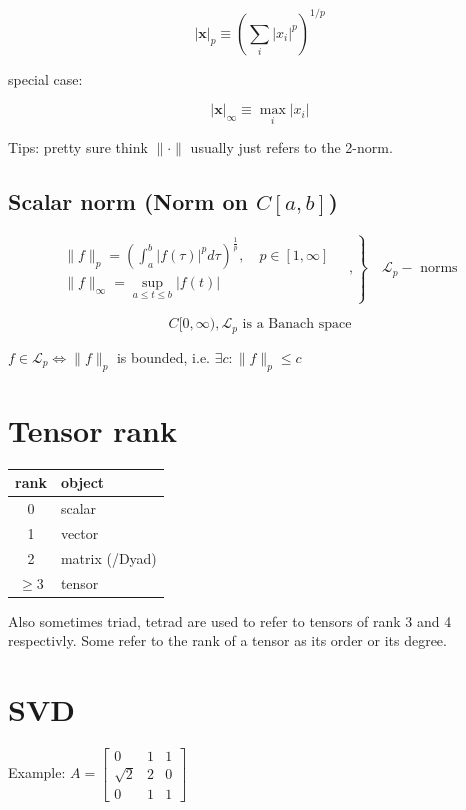 \documentclass[a4paper]{article}
\begin{document}
$$|\mathbf{x}|_{p} \equiv\left(\sum_{i}\left|x_{i}\right|^{p}\right)^{1 / p}$$

special case:

$$|\mathbf{x}|_{\infty} \equiv \max _{i}\left|x_{i}\right|$$



Tips: pretty sure think $\|\cdot\|$ usually just refers to the 2-norm.


\subsection*{Scalar norm (Norm on $C[a, b]$)}
\label{sec-1-4}

\begin{equation}
\left.\begin{array}{l}
{\|f\|_{p}=\left(\int_{a}^{b}|f(\tau)|^{p} d \tau\right)^{\frac{1}{p}}, \quad p \in[1, \infty]} \\ 
{\|f\|_{\infty}=\displaystyle\sup _{\scriptscriptstyle a \leq t \leq b}|f(t)| }\end{array} \quad,
\right\} \quad \mathscr{L}_{p}-\text { norms }
\end{equation}

$$
C[0, \infty), \mathscr{L}_{p} \text{ is a Banach space}
$$

$f \in \mathscr{L}_{p} \Leftrightarrow\|f\|_{p}$ is bounded, i.e. $\exists c:\|f\|_{p} \leq c$
\section{Tensor rank}
\label{sec-2}
\begin{table}[h]
\begin{tabular}{cl}
rank                & object   \\
\hline
0                   & scalar   \\
1                   & vector  \\
2                   & matrix (/Dyad)  \\
$\geq 3$ & tensor        
\end{tabular}
\end{table}
Also sometimes  triad, tetrad are used to refer to tensors of 
rank 3 and 4 respectivly. Some refer to the rank of a tensor as
its order or its degree.




\section{SVD}
\label{sec-3}
Example: 
$A=\left[\begin{array}{lll}{0} & {1} & {1} \\ {\sqrt{2}} & {2} & {0} \\ {0} & {1} & {1}\end{array}\right]$
\end{document}
